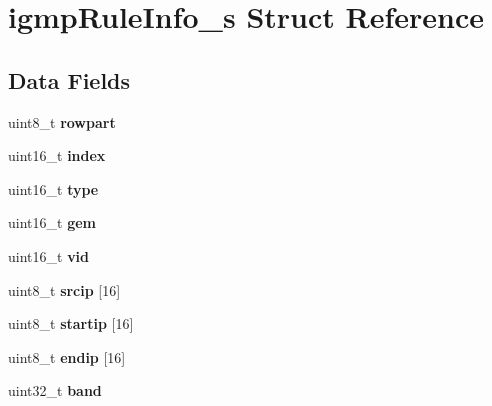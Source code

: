\hypertarget{structigmpRuleInfo__s}{}\section{igmp\+Rule\+Info\+\_\+s Struct Reference}
\label{structigmpRuleInfo__s}
\subsection*{Data Fields}
\begin{DoxyCompactItemize}
\item 
\mbox{\label{structigmpRuleInfo__s_abaafcd1c52fa47b7a5593f8bb382e298}} 
uint8\+\_\+t {\bfseries rowpart}
\item 
\mbox{\label{structigmpRuleInfo__s_a6386681c382d7a0dcd53662a2c901fc2}} 
uint16\+\_\+t {\bfseries index}
\item 
\mbox{\label{structigmpRuleInfo__s_ab697285dd97d3cfd249b42414cd59394}} 
uint16\+\_\+t {\bfseries type}
\item 
\mbox{\label{structigmpRuleInfo__s_a21813af5f877c683612db1c0856ce624}} 
uint16\+\_\+t {\bfseries gem}
\item 
\mbox{\label{structigmpRuleInfo__s_a61e237204873a02ff4c98b65769317ad}} 
uint16\+\_\+t {\bfseries vid}
\item 
\mbox{\label{structigmpRuleInfo__s_ae3dc0d17fb4bccde06162bb68889bfc0}} 
uint8\+\_\+t {\bfseries srcip} \mbox{[}16\mbox{]}
\item 
\mbox{\label{structigmpRuleInfo__s_a27a5270d2b0da2c1c4646927f288b036}} 
uint8\+\_\+t {\bfseries startip} \mbox{[}16\mbox{]}
\item 
\mbox{\label{structigmpRuleInfo__s_af542ed02c6debee16ffe8ce94025f0d3}} 
uint8\+\_\+t {\bfseries endip} \mbox{[}16\mbox{]}
\item 
\mbox{\label{structigmpRuleInfo__s_acca7285bd700d188cdf5c8b14e101ed6}} 
uint32\+\_\+t {\bfseries band}

\end{DoxyCompactItemize}
